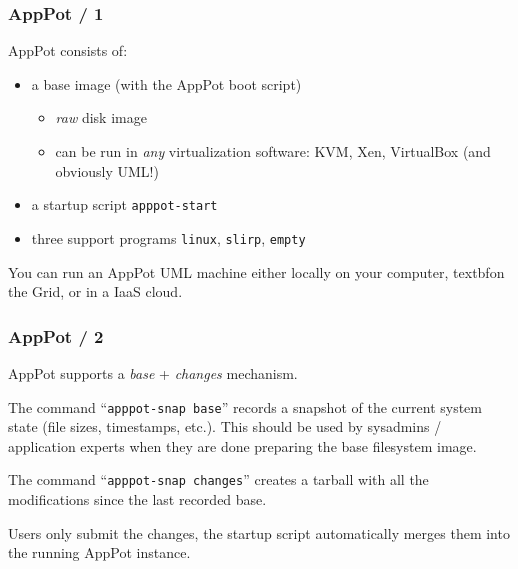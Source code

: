 \documentclass[english,serif,mathserif,xcolor=pdftex,dvipsnames,table]{beamer}
\begin{document}
\begin{frame}[label=AppPot]
  \frametitle{AppPot / 1}
  \label{sec:9}
  AppPot consists of:
  \begin{itemize}
  \item a base image (with the AppPot boot script)
    \begin{itemize}
    \item \emph{raw} disk image
    \item can be run in \emph{any} virtualization software: KVM, Xen,
      VirtualBox (and obviously UML!)
    \end{itemize}
  \item a startup script \texttt{apppot-start}
  \item three support programs \texttt{linux}, \texttt{slirp}, \texttt{empty}
  \end{itemize}

  \+
  You can run an AppPot UML machine either locally on your computer,
  textbf{on the Grid}, or in a IaaS cloud.

  \+
  \begin{flushright}
    \hyperlink{smscg2}{}
  \end{flushright}
\end{frame}


\begin{frame}
  \frametitle{AppPot / 2}
  \label{sec:15}
  AppPot supports a \emph{base} + \emph{changes} mechanism.

  \+
  The command ``\texttt{apppot-snap base}'' records a snapshot of the current
  system state (file sizes, timestamps, etc.).  This should be used by
  sysadmins / application experts when they are done preparing the
  base filesystem image.

  \+
  The command ``\texttt{apppot-snap changes}'' creates a tarball with all the
  modifications since the last recorded base.

  \+
  Users only submit the changes, the startup script automatically
  merges them into the running AppPot instance.

  \+
  \begin{flushright}
    \hyperlink{smscg2}{}
  \end{flushright}
\end{frame}
\end{document}
